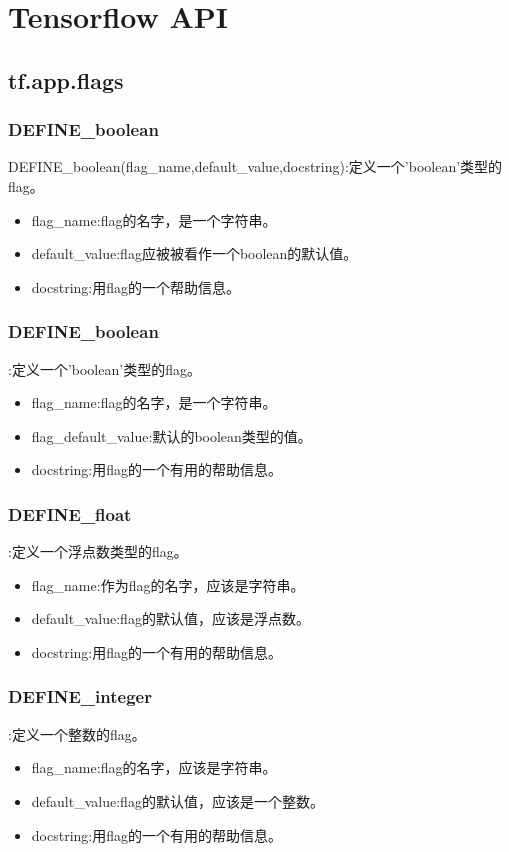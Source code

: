 \chapter{Tensorflow API}
\section{tf.app.flags}
\subsection{DEFINE\_boolean}
DEFINE\_boolean(flag\_name,default\_value,docstring):定义一个'boolean'类型的flag。
\begin{itemize}
\item flag\_name:flag的名字，是一个字符串。
\item default\_value:flag应被被看作一个boolean的默认值。
\item docstring:用flag的一个帮助信息。
\end{itemize}
\subsection{DEFINE\_boolean}:定义一个'boolean'类型的flag。
\begin{itemize}
\item flag\_name:flag的名字，是一个字符串。
\item flag\_default\_value:默认的boolean类型的值。
\item docstring:用flag的一个有用的帮助信息。
\end{itemize}
\subsection{DEFINE\_float}:定义一个浮点数类型的flag。
\begin{itemize}
\item flag\_name:作为flag的名字，应该是字符串。
\item default\_value:flag的默认值，应该是浮点数。
\item docstring:用flag的一个有用的帮助信息。
\end{itemize}
\subsection{DEFINE\_integer}:定义一个整数的flag。
\begin{itemize}
\item flag\_name:flag的名字，应该是字符串。
\item default\_value:flag的默认值，应该是一个整数。
\item docstring:用flag的一个有用的帮助信息。
\end{itemize}
